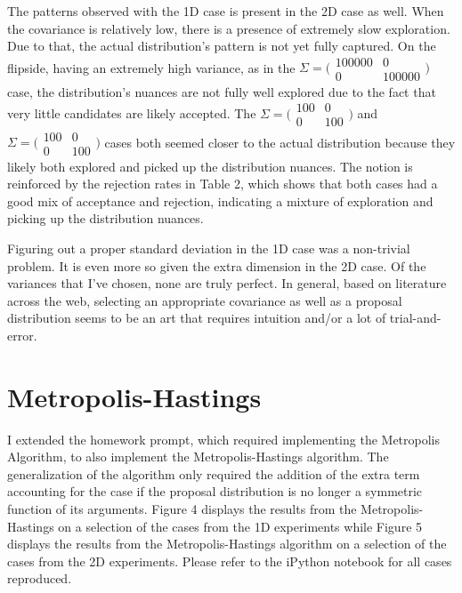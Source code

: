 \documentclass{article} %
\begin{document}
The patterns observed with the 1D case is present in the 2D case as well. When the covariance is relatively low, there is a presence of extremely slow exploration. Due to that, the actual distribution's pattern is not yet fully captured. On the flipside, having an extremely high variance, as in the \(\Sigma = \bigl(\begin{smallmatrix} 100000&0\\0&100000 \end{smallmatrix} \bigr)\) case, the distribution's nuances are not fully well explored due to the fact that very little candidates are likely accepted. The \(\Sigma =  \bigl(\begin{smallmatrix} 100&0\\0&100 \end{smallmatrix} \bigr)\) and \(\Sigma = \bigl(\begin{smallmatrix} 100&0\\0&100 \end{smallmatrix} \bigr)\) cases both seemed closer to the actual distribution because they likely both explored and picked up the distribution nuances. The notion is reinforced by the rejection rates in Table 2, which shows that both cases had a good mix of acceptance and rejection, indicating a mixture of exploration and picking up the distribution nuances.

Figuring out a proper standard deviation in the 1D case was a non-trivial problem. It is even more so given the extra dimension in the 2D case. Of the variances that I've chosen, none are truly perfect. In general, based on literature across the web, selecting an appropriate covariance as well as a proposal distribution seems to be an art that requires intuition and/or a lot of trial-and-error. 

\section{Metropolis-Hastings}

I extended the homework prompt, which required implementing the Metropolis Algorithm, to also implement the Metropolis-Hastings algorithm. The generalization of the algorithm only required the addition of the extra term accounting for the case if the proposal distribution is no longer a symmetric function of its arguments. Figure 4 displays the results from the Metropolis-Hastings on a selection of the cases from the 1D experiments while Figure 5 displays the results from the Metropolis-Hastings algorithm on a selection of the cases from the 2D experiments. Please refer to the iPython notebook for all cases reproduced. 
\end{document}
